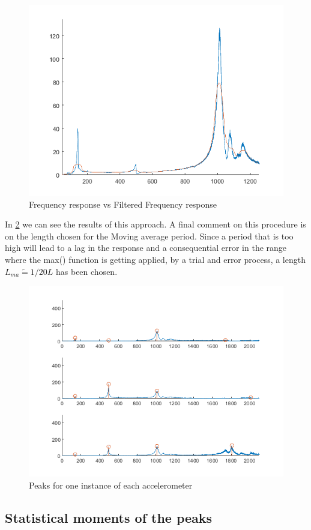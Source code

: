\documentclass[12pt,a4paper,twoside]{article}
\begin{document}
\begin{figure}[h!]
	\centering
	\includegraphics[width=0.8\linewidth]{Images/confronto.png}
	\caption{Frequency response vs Filtered Frequency response}
	\label{confronto}
\end{figure}
\noindent

In \figurename{ \ref{peaks}} we can see the results of this approach. A final comment on this procedure is on the length chosen for the Moving average period. Since a period that is too high will lead to a lag in the response and a consequential error in the range where the max() function is getting applied, by a trial and error process, a length $L_{ma} \tilde{=} 1/20 L$ has been chosen.

\begin{figure}[h!]
	\centering
	\includegraphics[width=0.8\linewidth]{Images/peaks.png}
	\caption{Peaks for one instance of each accelerometer}
	\label{peaks}
\end{figure}
\noindent

%
\subsection{Statistical moments of the peaks}
\end{document}
